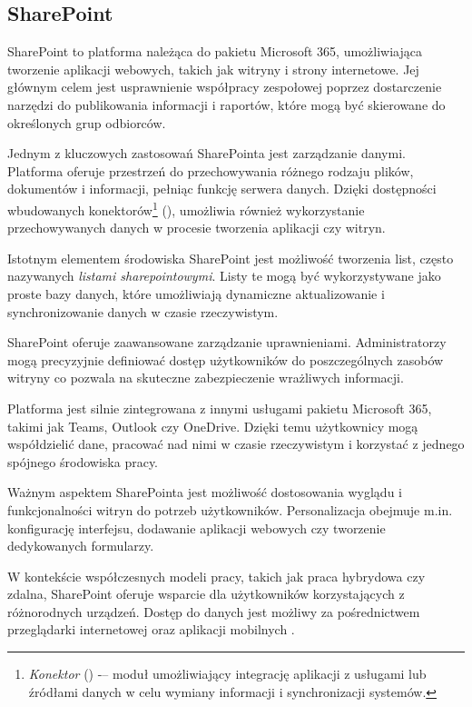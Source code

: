 \subsection{SharePoint}
SharePoint to platforma należąca do pakietu Microsoft 365, umożliwiająca tworzenie aplikacji webowych, takich jak witryny i strony internetowe. Jej głównym celem jest usprawnienie współpracy zespołowej poprzez dostarczenie narzędzi do publikowania informacji i raportów, które mogą być skierowane do określonych grup odbiorców. \par
Jednym z kluczowych zastosowań SharePointa jest zarządzanie danymi. Platforma oferuje przestrzeń do przechowywania różnego rodzaju plików, dokumentów i informacji, pełniąc funkcję serwera danych. Dzięki dostępności wbudowanych konektorów\footnote{\emph{Konektor} () -– moduł umożliwiający integrację aplikacji z usługami lub źródłami danych w celu wymiany informacji i synchronizacji systemów.} (), umożliwia również wykorzystanie przechowywanych danych w procesie tworzenia aplikacji czy witryn. \par
Istotnym elementem środowiska SharePoint jest możliwość tworzenia list, często nazywanych \emph{listami sharepointowymi}. Listy te mogą być wykorzystywane jako proste bazy danych, które umożliwiają dynamiczne aktualizowanie i synchronizowanie danych w czasie rzeczywistym. \par
SharePoint oferuje zaawansowane zarządzanie uprawnieniami. Administratorzy mogą precyzyjnie definiować dostęp użytkowników do poszczególnych zasobów witryny co pozwala na skuteczne zabezpieczenie wrażliwych informacji. \par
Platforma jest silnie zintegrowana z innymi usługami pakietu Microsoft 365, takimi jak Teams, Outlook czy OneDrive. Dzięki temu użytkownicy mogą współdzielić dane, pracować nad nimi w czasie rzeczywistym i korzystać z jednego spójnego środowiska pracy. \par
Ważnym aspektem SharePointa jest możliwość dostosowania wyglądu i funkcjonalności witryn do potrzeb użytkowników. Personalizacja obejmuje m.in. konfigurację interfejsu, dodawanie aplikacji webowych czy tworzenie dedykowanych formularzy. \par
W kontekście współczesnych modeli pracy, takich jak praca hybrydowa czy zdalna, SharePoint oferuje wsparcie dla użytkowników korzystających z różnorodnych urządzeń. Dostęp do danych jest możliwy za pośrednictwem przeglądarki internetowej oraz aplikacji mobilnych \texorpdfstring{\cite{maggierui_introduction_2024}}{}.
